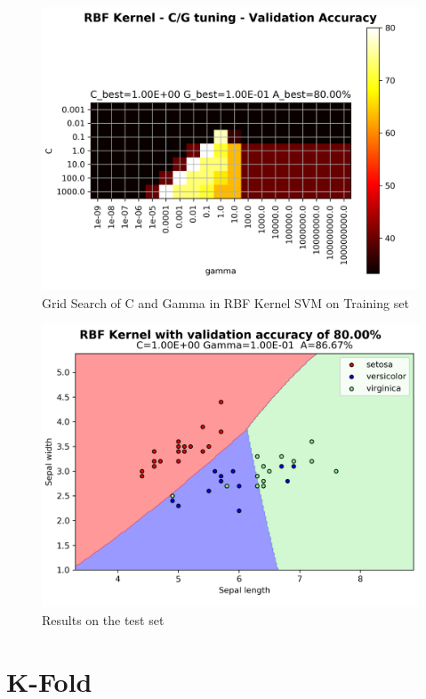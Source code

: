 \documentclass[a4paper, 11pt]{article}
\begin{document}
	\begin{figure}[ht!]
		\centering
		\includegraphics[width=0.7\paperwidth]{img/fig02d.png}
		\caption{Grid Search of C and Gamma in RBF Kernel SVM on Training set}
		\label{fig:rbf4}
	\end{figure}
	
	\begin{figure}[ht!]
		\centering
		\includegraphics[width=0.7\paperwidth]{img/fig02e.png}
		\caption{Results on the test set}
		\label{fig:rbf5}
	\end{figure}
		
	\FloatBarrier
	
	\section{K-Fold}
		
\end{document}

